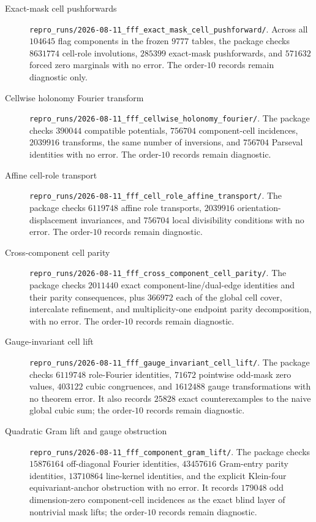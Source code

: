 \begin{description}
\item[Exact-mask cell pushforwards]
\nolinkurl{repro_runs/2026-08-11_fff_exact_mask_cell_pushforward/}.
Across all $104645$ flag components in the frozen $9777$ tables, the package
checks $8631774$ cell-role involutions, $285399$ exact-mask pushforwards, and
$571632$ forced zero marginals with no error.  The order-$10$ records remain
diagnostic only.

\item[Cellwise holonomy Fourier transform]
\nolinkurl{repro_runs/2026-08-11_fff_cellwise_holonomy_fourier/}.
The package checks $390044$ compatible potentials, $756704$ component-cell
incidences, $2039916$ transforms, the same number of inversions, and $756704$
Parseval identities with no error.  The order-$10$ records remain diagnostic.

\item[Affine cell-role transport]
\nolinkurl{repro_runs/2026-08-11_fff_cell_role_affine_transport/}.
The package checks $6119748$ affine role transports, $2039916$ orientation-
displacement invariances, and $756704$ local divisibility conditions with no
error.  The order-$10$ records remain diagnostic.

\item[Cross-component cell parity]
\nolinkurl{repro_runs/2026-08-11_fff_cross_component_cell_parity/}.
The package checks $2011440$ exact component-line/dual-edge identities and
their parity consequences, plus $366972$ each of the global cell cover,
intercalate refinement, and multiplicity-one endpoint parity decomposition,
with no error.  The order-$10$ records remain diagnostic.

\item[Gauge-invariant cell lift]
\nolinkurl{repro_runs/2026-08-11_fff_gauge_invariant_cell_lift/}.
The package checks $6119748$ role-Fourier identities, $71672$ pointwise
odd-mask zero values, $403122$ cubic congruences, and $1612488$ gauge
transformations with no theorem error.  It also records $25828$ exact
counterexamples to the naive global cubic sum; the order-$10$ records remain
diagnostic.

\item[Quadratic Gram lift and gauge obstruction]
\nolinkurl{repro_runs/2026-08-11_fff_component_gram_lift/}.
The package checks $15876164$ off-diagonal Fourier identities, $43457616$
Gram-entry parity identities, $13710864$ line-kernel identities, and the
explicit Klein-four equivariant-anchor obstruction with no error.  It records
$179048$ odd dimension-zero component-cell incidences as the exact blind
layer of nontrivial mask lifts; the order-$10$ records remain diagnostic.


\end{description}
